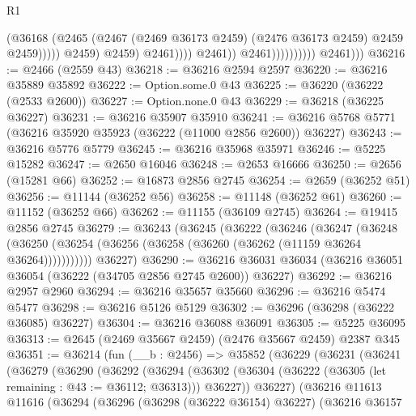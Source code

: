 \begin{lexlean}{R1}
\begin{coremodule}
                                                  (@36168
                                                    (@2465
                                                      (@2467
                                                        (@2469 @36173 @2459)
                                                        (@2476 @36173 @2459)
                                                        @2459
                                                        @2459)))))
                                              @2459)
                                            @2459)
                                          @2461))))
                                  @2461))
                              @2461))))))))))
          @2461)))
@36216 := @2466 (@2559 @43)
@36218 := @36216 @2594 @2597
@36220 := @36216 @35889 @35892
@36222 := Option.some.{0} @43
@36225 := @36220 (@36222 (@2533 @2600))
@36227 := Option.none.{0} @43
@36229 := @36218 (@36225 @36227)
@36231 := @36216 @35907 @35910
@36241 := @36216 @5768 @5771 (@36216 @35920 @35923 (@36222 (@11000 @2856 @2600)) @36227)
@36243 := @36216 @5776 @5779
@36245 := @36216 @35968 @35971
@36246 := @5225 @15282
@36247 := @2650 @16046
@36248 := @2653 @16666
@36250 := @2656 (@15281 @66)
@36252 := @16873 @2856 @2745
@36254 := @2659 (@36252 @51)
@36256 := @11144 (@36252 @56)
@36258 := @11148 (@36252 @61)
@36260 := @11152 (@36252 @66)
@36262 := @11155 (@36109 @2745)
@36264 := @19415 @2856 @2745
@36279 := @36243
    (@36245
      (@36222
        (@36246
          (@36247
            (@36248 (@36250 (@36254 (@36256 (@36258 (@36260 (@36262 (@11159 @36264 @36264)))))))))))
      @36227)
@36290 := @36216 @36031 @36034 (@36216 @36051 @36054 (@36222 (@34705 @2856 @2745 @2600)) @36227)
@36292 := @36216 @2957 @2960
@36294 := @36216 @35657 @35660
@36296 := @36216 @5474 @5477
@36298 := @36216 @5126 @5129
@36302 := @36296 (@36298 (@36222 @36085) @36227)
@36304 := @36216 @36088 @36091
@36305 := @5225 @36095
@36313 := @2645 (@2469 @35667 @2459) (@2476 @35667 @2459) @2387 @345
@36351 := @36214
    (fun (__b : @2456) =>
    @35852
      (@36229
        (@36231
          (@36241
            (@36279
              (@36290
                (@36292
                  (@36294
                    (@36302
                      (@36304 (@36222 (@36305 (let remaining : @43 := @36112; @36313))) @36227))
                    @36227)
                  (@36216
                    @11613
                    @11616
                    (@36294
                      (@36296
                        (@36298 (@36222 @36154) @36227)
                        (@36216
                          @36157

\end{coremodule}
\end{lexlean}
